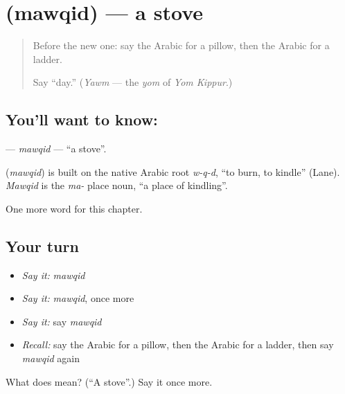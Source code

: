 \section[\texorpdfstring{\ar{موقد} (mawqid)}{موقد (mawqid)}]{ (mawqid) — a stove}

\label{lesson:AR-C123-mawqid}



\begin{quote}
Before the new one: say the Arabic for a pillow, then the Arabic for a ladder.

Say \textquotedblleft{}day.\textquotedblright{} (\emph{Yawm} — the \emph{yom} of \emph{Yom Kippur}.)
\end{quote}

\subsection*{You'll want to know: }
\textbf{} — \emph{mawqid} — \textquotedblleft{}a stove\textquotedblright{}.

\begin{cousinweb}
\textbf{} (\emph{mawqid}) is built on the native Arabic root \emph{w-q-d}, \textquotedblleft{}to burn, to kindle\textquotedblright{} (Lane). \emph{Mawqid} is the \emph{ma-} place noun, \textquotedblleft{}a place of kindling\textquotedblright{}.
\end{cousinweb}

\begin{grammarlens}[title={What you've built}]
One more word for this chapter.
\end{grammarlens}

\subsection*{Your turn}
\begin{itemize}
\raggedright
  \item \emph{Say it:} \emph{mawqid}
  \item \emph{Say it:} \emph{mawqid}, once more
  \item \emph{Say it:} say \emph{mawqid}
  \item \emph{Recall:} say the Arabic for a pillow, then the Arabic for a ladder, then say \emph{mawqid} again
\end{itemize}

\begin{tcolorbox}[breakable,colback=teal!4,colframe=teal!35!black,title={Before you move on}]
What does  mean? (\textquotedblleft{}A stove\textquotedblright{}.) Say it once more.
\end{tcolorbox}
